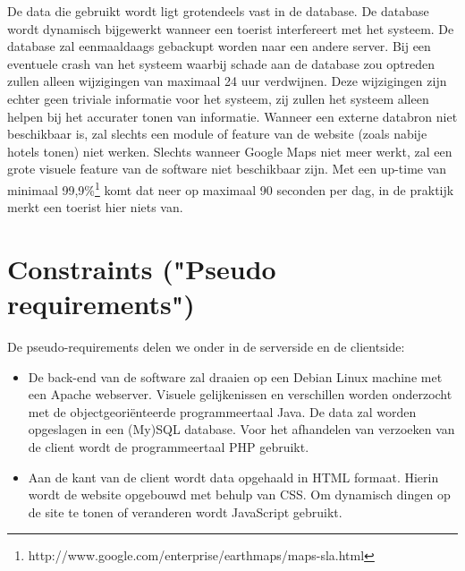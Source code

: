 \documentclass[a4paper,10pt]{article}
\newcommand{\rsection}[1]{
\section{#1}\label{sec:#1}
}
\begin{document}
			De data die gebruikt wordt ligt grotendeels vast in de database. De database wordt dynamisch bijgewerkt wanneer een toerist interfereert met het systeem. De database zal eenmaaldaags gebackupt worden naar een andere server. Bij een eventuele crash van het systeem waarbij schade aan de database zou optreden zullen alleen wijzigingen van maximaal 24 uur verdwijnen. Deze wijzigingen zijn echter geen triviale informatie voor het systeem, zij zullen het systeem alleen helpen bij het accurater tonen van informatie. Wanneer een externe databron niet beschikbaar is, zal slechts een module of feature van de website (zoals nabije hotels tonen) niet werken. Slechts wanneer Google Maps niet meer werkt, zal een grote visuele feature van de software niet beschikbaar zijn. Met een up-time van minimaal 99,9\%\footnote{http://www.google.com/enterprise/earthmaps/maps-sla.html} komt dat neer op maximaal 90 seconden per dag, in de praktijk merkt een toerist hier niets van.
			
		\clearpage
		\rsection{Constraints ("Pseudo requirements")}
			De pseudo-requirements delen we onder in de serverside en de clientside:
			\begin{itemize}
				\item De back-end van de software zal draaien op een Debian Linux machine met een Apache webserver. Visuele gelijkenissen en verschillen worden onderzocht met de objectgeori\"enteerde programmeertaal Java. De data zal worden opgeslagen in een (My)SQL database. Voor het afhandelen van verzoeken van de client wordt de programmeertaal PHP gebruikt.
				\item Aan de kant van de client wordt data opgehaald in HTML formaat. Hierin wordt de website opgebouwd met behulp van CSS. Om dynamisch dingen op de site te tonen of veranderen wordt JavaScript gebruikt.
			\end{itemize}
		
\end{document}
